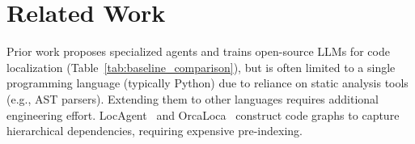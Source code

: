 \section{Related Work}
\label{sec:background}
Prior work proposes specialized agents and trains open-source LLMs for code localization (Table~\ref{tab:baseline_comparison}), but is often limited to a single programming language (typically Python) due to reliance on static analysis tools (e.g., AST parsers). Extending them to other languages requires additional engineering effort. LocAgent~\citep{chen-etal-2025-locagent} and OrcaLoca~\citep{ yu2025orcalocallmagentframework} construct code graphs to capture hierarchical dependencies, requiring expensive pre-indexing.
\begin{table}
    \centering
    \vspace{-7pt} %
    \caption{Comparison of code localization methods. \methodname is the only method that directly post-trains LLMs with RL using a programming language-agnostic scaffold equipped \emph{solely} with a bash terminal.}
    \label{tab:baseline_comparison}
    \vspace{-7pt}
\end{table}
